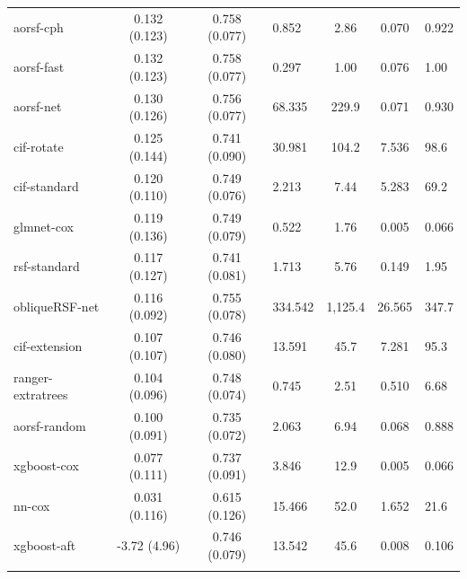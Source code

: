 \documentclass[twoside,11pt]{article}\usepackage[]{graphicx}\usepackage[]{xcolor}
\newenvironment{knitrout}{}{} %
\begin{document}
\begin{knitrout}
\begin{longtable}{lcclccl}
\endfoot
\bottomrule
\endlastfoot
\addlinespace[0.3em]
\hline
\multicolumn{7}{l}{\textit{\textbf{Overall}}}\\
\hline
\hspace{1em}aorsf-cph & 0.132 (0.123) & 0.758 (0.077) & 0.852 & 2.86 & 0.070 & 0.922\\
\hspace{1em}aorsf-fast & 0.132 (0.123) & 0.758 (0.077) & 0.297 & 1.00 & 0.076 & 1.00\\
\hspace{1em}aorsf-net & 0.130 (0.126) & 0.756 (0.077) & 68.335 & 229.9 & 0.071 & 0.930\\
\hspace{1em}cif-rotate & 0.125 (0.144) & 0.741 (0.090) & 30.981 & 104.2 & 7.536 & 98.6\\
\hspace{1em}cif-standard & 0.120 (0.110) & 0.749 (0.076) & 2.213 & 7.44 & 5.283 & 69.2\\
\hspace{1em}glmnet-cox & 0.119 (0.136) & 0.749 (0.079) & 0.522 & 1.76 & 0.005 & 0.066\\
\hspace{1em}rsf-standard & 0.117 (0.127) & 0.741 (0.081) & 1.713 & 5.76 & 0.149 & 1.95\\
\hspace{1em}obliqueRSF-net & 0.116 (0.092) & 0.755 (0.078) & 334.542 & 1,125.4 & 26.565 & 347.7\\
\hspace{1em}cif-extension & 0.107 (0.107) & 0.746 (0.080) & 13.591 & 45.7 & 7.281 & 95.3\\
\hspace{1em}ranger-extratrees & 0.104 (0.096) & 0.748 (0.074) & 0.745 & 2.51 & 0.510 & 6.68\\
\hspace{1em}aorsf-random & 0.100 (0.091) & 0.735 (0.072) & 2.063 & 6.94 & 0.068 & 0.888\\
\hspace{1em}xgboost-cox & 0.077 (0.111) & 0.737 (0.091) & 3.846 & 12.9 & 0.005 & 0.066\\
\hspace{1em}nn-cox & 0.031 (0.116) & 0.615 (0.126) & 15.466 & 52.0 & 1.652 & 21.6\\
\hspace{1em}xgboost-aft & -3.72 (4.96) & 0.746 (0.079) & 13.542 & 45.6 & 0.008 & 0.106\\
\addlinespace[0.3em]
\hline
\multicolumn{7}{l}{\textit{\textbf{ACTG 320; AIDS diagnosis, n = 1151, p = 12}}}\\

\end{longtable}
\end{knitrout}
\end{document}

